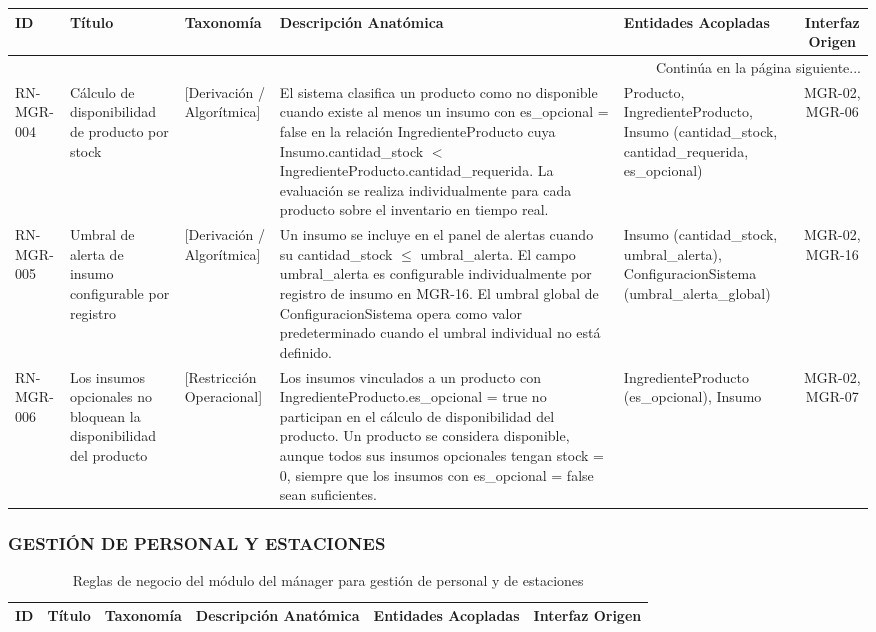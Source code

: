 \begin{landscape}
\begin{longtable}[c]{l p{2.1cm} p{2.1cm} p{8cm} p{4cm} c}
\toprule
\textbf{ID} & \textbf{Título} & \textbf{Taxonomía} & \textbf{Descripción Anatómica} & \textbf{Entidades Acopladas} & \textbf{Interfaz Origen} \\
\midrule
\endhead

\midrule
\multicolumn{6}{r}{\small Continúa en la página siguiente...} \\
\endfoot
\bottomrule
\endlastfoot

RN-MGR-004 & Cálculo de disponibilidad de producto por stock & [Derivación / Algorítmica] & El sistema clasifica un producto como no disponible cuando existe al menos un insumo con es\_opcional = false en la relación IngredienteProducto cuya Insumo.cantidad\_stock $<$ IngredienteProducto.cantidad\_requerida. La evaluación se realiza individualmente para cada producto sobre el inventario en tiempo real. & Producto, IngredienteProducto, Insumo (cantidad\_stock, cantidad\_requerida, es\_opcional) & MGR-02, MGR-06 \\
\addlinespace
RN-MGR-005 & Umbral de alerta de insumo configurable por registro & [Derivación / Algorítmica] & Un insumo se incluye en el panel de alertas cuando su cantidad\_stock $\le$ umbral\_alerta. El campo umbral\_alerta es configurable individualmente por registro de insumo en MGR-16. El umbral global de ConfiguracionSistema opera como valor predeterminado cuando el umbral individual no está definido. & Insumo (cantidad\_stock, umbral\_alerta), ConfiguracionSistema (umbral\_alerta\_global) & MGR-02, MGR-16 \\
\addlinespace
RN-MGR-006 & Los insumos opcionales no bloquean la disponibilidad del producto & [Restricción Operacional] & Los insumos vinculados a un producto con IngredienteProducto.es\_opcional = true no participan en el cálculo de disponibilidad del producto. Un producto se considera disponible, aunque todos sus insumos opcionales tengan stock = 0, siempre que los insumos con es\_opcional = false sean suficientes. & IngredienteProducto (es\_opcional), Insumo & MGR-02, MGR-07 \\
\end{longtable}
\endgroup

\subsubsection{GESTIÓN DE PERSONAL Y ESTACIONES}
\begingroup
\setlength{\LTleft}{\fill}
\setlength{\LTright}{\fill}

\begin{longtable}[c]{l p{2.1cm} p{2.1cm} p{8cm} p{4cm} p{3cm}}
\caption{Reglas de negocio del módulo del mánager para gestión de personal y de estaciones} \label{tab:reglas-negocio-manager-personal}\\
\toprule
\textbf{ID} & \textbf{Título} & \textbf{Taxonomía} & \textbf{Descripción Anatómica} & \textbf{Entidades Acopladas} & \textbf{Interfaz Origen} \\
\midrule
\endfirsthead


\end{longtable}
\end{landscape}
